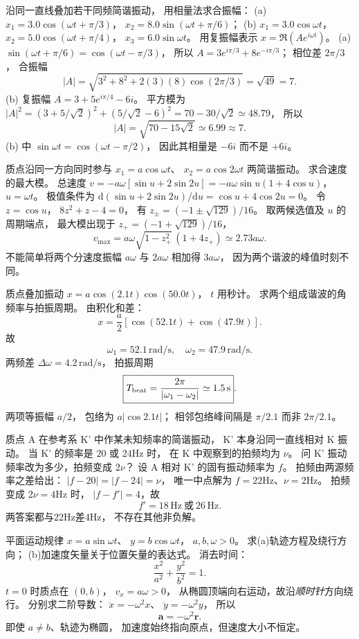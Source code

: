沿同一直线叠加若干同频简谐振动，
用相量法求合振幅：
(a) $x_1=3.0\cos(\omega t+\pi/3)$，
$x_2=8.0\sin(\omega t+\pi/6)$；
(b) $x_1=3.0\cos\omega t$，
$x_2=5.0\cos(\omega t+\pi/4)$，
$x_3=6.0\sin\omega t$。
\exsolution
用复振幅表示 $x=\Re(Ae^{i\omega t})$。
(a) $\sin(\omega t+\pi/6)=\cos(\omega t-\pi/3)$，
所以
$A=3e^{i\pi/3}+8e^{-i\pi/3}$；
相位差 $2\pi/3$，
合振幅
\[
\boxed{|A|=\sqrt{3^2+8^2+2(3)(8)\cos(2\pi/3)}
=\sqrt{49}=7}.
\]
(b) 复振幅
$A=3+5e^{i\pi/4}-6i$。
平方模为
$|A|^2=(3+5/\sqrt2)^2+(5/\sqrt2-6)^2
=70-30/\sqrt2\simeq48.79$，
所以
\[
\boxed{|A|=\sqrt{70-15\sqrt2}\simeq6.99\approx7}.
\]
\excheck (b) 中
$\sin\omega t=\cos(\omega t-\pi/2)$，
因此其相量是 $-6i$ 而不是 $+6i$。

质点沿同一方向同时参与
$x_1=a\cos\omega t$、
$x_2=a\cos2\omega t$ 两简谐振动。
求合速度的最大模。
\exsolution
总速度
$v=-a\omega[\sin u+2\sin2u]
=-a\omega\sin u(1+4\cos u)$，
$u=\omega t$。
极值条件为
$\mathrm d(\sin u+2\sin2u)/\mathrm du
=\cos u+4\cos2u=0$。
令 $z=\cos u$，
$8z^2+z-4=0$，
有
$z_\pm=(-1\pm\sqrt{129})/16$。
取两候选值及 $u$ 的周期端点，
最大模出现于 $z_+=(-1+\sqrt{129})/16$，
\[
\boxed{v_{\max}=a\omega
\sqrt{1-z_+^2}\,(1+4z_+)
\simeq2.73a\omega}.
\]
\excheck 不能简单将两个分速度振幅
$a\omega$ 与 $2a\omega$ 相加得 $3a\omega$，
因为两个谐波的峰值时刻不同。

质点叠加振动
$x=a\cos(2.1t)\cos(50.0t)$，
$t$ 用秒计。
求两个组成谐波的角频率与拍振周期。
\exsolution
由积化和差：
\[
x=\frac a2[\cos(52.1t)+\cos(47.9t)].
\]
故
\[
\boxed{\omega_1=52.1\,\mathrm{rad/s},
\quad\omega_2=47.9\,\mathrm{rad/s}}.
\]
两频差
$\Delta\omega=4.2\,\mathrm{rad/s}$，
拍振周期
\[
\boxed{T_{\rm beat}=\frac{2\pi}{|\omega_1-\omega_2|}
\simeq1.5\,\mathrm s}.
\]
\excheck 两项等振幅 $a/2$，
包络为 $a|\cos2.1t|$；
相邻包络峰间隔是 $\pi/2.1$ 而非 $2\pi/2.1$。

质点 A 在参考系 K' 中作某未知频率的简谐振动，
K' 本身沿同一直线相对 K 振动。
当 K' 的频率是 $20$ 或 $24$Hz 时，
在 K 中观察到的拍频均为 $\nu$。
问 K' 振动频率改为多少，拍频变成 $2\nu$？
\exsolution
设 A 相对 K' 的固有振动频率为 $f$。
拍频由两源频率之差给出：
$|f-20|=|f-24|=\nu$，
唯一中点解为
$f=22$Hz、$\nu=2$Hz。
拍频变成 $2\nu=4$Hz 时，
$|f-f'|=4$，故
\[
\boxed{f'=18\,\mathrm{Hz}\ \text{或}\ 26\,\mathrm{Hz}}.
\]
\excheck 两答案都与22Hz差4Hz，
不存在其他非负解。

平面运动规律
$x=a\sin\omega t$、
$y=b\cos\omega t$，
$a,b,\omega>0$。
求(a)轨迹方程及绕行方向；
(b)加速度矢量关于位置矢量的表达式。
\exsolution
消去时间：
\[
\boxed{\frac{x^2}{a^2}+\frac{y^2}{b^2}=1}.
\]
$t=0$ 时质点在 $(0,b)$，
$v_x=a\omega>0$，
从椭圆顶端向右运动，故沿\emph{顺时针}方向绕行。
分别求二阶导数：
$\ddot x=-\omega^2x$、
$\ddot y=-\omega^2y$，
所以
\[
\boxed{\bm a=-\omega^2\bm r}.
\]
\excheck 即使 $a\ne b$、轨迹为椭圆，
加速度始终指向原点，但速度大小不恒定。

